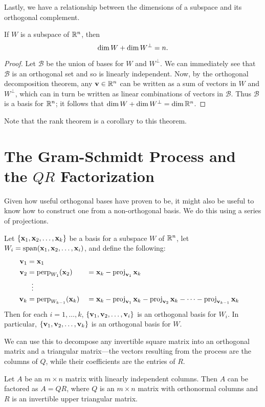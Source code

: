 \documentclass[../m073main.tex]{subfiles}
\begin{document}
Lastly, we have a relationship between the dimensions of a subspace and its orthogonal complement.

\begin{theorem}
	If $W$ is a subspace of $\mathbb{R}^n$, then
	\[ \operatorname{dim} W + \operatorname{dim} W^\perp = n. \]
\end{theorem}

\begin{proof}
	Let $\mathcal B$ be the union of bases for $W$ and $W^\perp$.
	We can immediately see that $\mathcal B$ is an orthogonal set and so is linearly independent.
	Now, by the orthogonal decomposition theorem, any $\mathbf{v} \in \mathbb{R}^n$ can be written as a sum of vectors in $W$ and $W^\perp$, which can in turn be written as linear combinations of vectors in $\mathcal B$.
	Thus $\mathcal B$ is a basis for $\mathbb{R}^n$; it follows that $\operatorname{dim} W + \operatorname{dim} W^\perp = \dim \mathbb{R}^n$.
\end{proof}

Note that the rank theorem is a corollary to this theorem.

\section{The Gram-Schmidt Process and the $QR$ Factorization}
Given how useful orthogonal bases have proven to be, it might also be useful to know how to construct one from a non-orthogonal basis.
We do this using a series of projections.

\begin{theorem}
	Let $\{\mathbf{x}_1, \mathbf{x}_2, \ldots, \mathbf{x}_k\}$ be a basis for a subspace $W$ of $\mathbb{R}^n$, let $W_i = \operatorname{span}(\mathbf{x}_1, \mathbf{x}_2, \ldots, \mathbf{x}_i)$, and define the following:
	\begin{alignat*}{2}
		\mathbf{v}_1 &= \mathbf{x}_1 \\
		\mathbf{v}_2 &= \operatorname{perp}_{W_1}(\mathbf{x}_2) &&= \mathbf{x}_k - \operatorname{proj}_{\mathbf{v}_1}\mathbf{x}_k \\
		&\phantom{~!}\vdots \\
		\mathbf{v}_k &= \operatorname{perp}_{W_{k-1}}(\mathbf{x}_k) &&= \mathbf{x}_k - \operatorname{proj}_{\mathbf{v}_1}\mathbf{x}_k - \operatorname{proj}_{\mathbf{v}_2}\mathbf{x}_k - \cdots - \operatorname{proj}_{\mathbf{v}_{k-1}}\mathbf{x}_k
	\end{alignat*}
	Then for each $i = 1, \ldots, k$, $\{\mathbf{v}_1, \mathbf{v}_2, \ldots, \mathbf{v}_i\}$ is an orthogonal basis for $W_i$.
	In particular, $\{\mathbf{v}_1, \mathbf{v}_2, \ldots, \mathbf{v}_k\}$ is an orthogonal basis for $W$.
\end{theorem}

We can use this to decompose any invertible square matrix into an orthogonal matrix and a triangular matrix---the vectors resulting from the process are the columns of $Q$, while their coefficients are the entries of $R$.

\begin{theorem}[$QR$ factorization]
	Let $A$ be an $m \times n$ matrix with linearly independent columns.
	Then $A$ can be factored as $A = QR$, where $Q$ is an $m \times n$ matrix with orthonormal columns and $R$ is an invertible upper triangular matrix.
\end{theorem}
\end{document}
